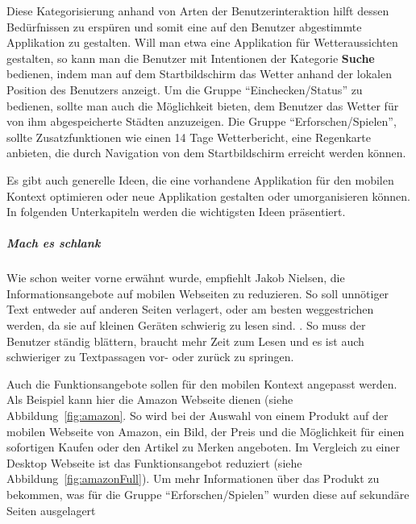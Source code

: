 Diese Kategorisierung anhand von Arten der Benutzerinteraktion hilft dessen Bedürfnissen zu erspüren und somit eine auf den Benutzer abgestimmte Applikation zu gestalten. Will man etwa eine Applikation für Wetteraussichten gestalten, so kann man die Benutzer mit Intentionen der Kategorie \textbf{Suche} bedienen, indem man auf dem Startbildschirm das Wetter anhand der lokalen Position des Benutzers anzeigt. Um die Gruppe “Einchecken/Status” zu bedienen, sollte man auch die Möglichkeit bieten, dem Benutzer das Wetter für von ihm abgespeicherte Städten anzuzeigen. Die Gruppe “Erforschen/Spielen”, sollte Zusatzfunktionen wie einen 14 Tage Wetterbericht, eine Regenkarte anbieten, die durch Navigation von dem Startbildschirm erreicht werden können.

Es gibt auch generelle Ideen, die eine vorhandene Applikation für den mobilen Kontext optimieren oder neue Applikation gestalten oder umorganisieren können. In folgenden Unterkapiteln werden die wichtigsten Ideen präsentiert. 

\subparagraph{Mach es schlank} 
\label{subp:entferne_das_fett}

Wie schon weiter vorne erwähnt wurde, empfiehlt Jakob Nielsen, die Informationsangebote auf mobilen Webseiten zu reduzieren. So soll unnötiger Text entweder auf anderen Seiten verlagert, oder am besten weggestrichen werden, da sie auf kleinen Geräten schwierig zu lesen sind. \cite[Seite 102]{Nielsen:2012wj}. So muss der Benutzer ständig blättern, braucht mehr Zeit zum Lesen und es ist auch schwieriger zu Textpassagen vor- oder zurück zu springen.

Auch die Funktionsangebote sollen für den mobilen Kontext angepasst werden. Als Beispiel kann hier die Amazon Webseite dienen (siehe Abbildung~\ref{fig:amazon}. So wird bei der Auswahl von einem Produkt auf der mobilen Webseite von Amazon, ein Bild, der Preis und die Möglichkeit für einen sofortigen Kaufen oder den Artikel zu Merken angeboten. Im Vergleich zu einer Desktop Webseite ist das  Funktionsangebot reduziert (siehe Abbildung~\ref{fig:amazonFull}). Um mehr Informationen über das Produkt zu bekommen, was für die Gruppe “Erforschen/Spielen” wurden diese auf sekundäre Seiten ausgelagert


